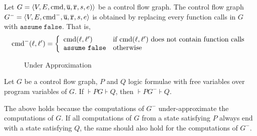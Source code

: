 
Let $G = \langle V, E, \textmd{cmd}, \overline{\texttt{u}}, \overline{\texttt{r}},s,e) \rangle$ be a control flow
graph. The control flow graph $G^- = \langle V, E,
\textmd{cmd}^-, \overline{\texttt{u}}, \overline{\texttt{r}},s,e \rangle$ is obtained by replacing every
function calls in $G$ with $\mathtt{assume\ false}$. That is,
\begin{equation*}
  \textmd{cmd}^- (\ell, \ell') =
  \left\{
    \begin{array}{ll}
      \textmd{cmd} (\ell, \ell') & 
      \textmd{if } \textmd{cmd} (\ell, \ell') 
      \textmd{ does not contain function calls}\\
      \mathtt{assume\ false} &
      \textmd{otherwise}
    \end{array}
  \right.
\end{equation*}

\begin{figure}
  \centering

  \caption{Under Approximation}
  \label{figure:under-approximation}
\end{figure}

\begin{proposition}
  Let $G$ be a control flow graph, $P$ and $Q$ logic formulae with
  free variables over program variables of $G$. If $\assert{P}
  G \assert{Q}$, then 
  $\assert{P} G^- \assert{Q}$.
\end{proposition}
The above holds because the computations of $G^-$ under-approximate the computations of $G$. If all computations of $G$ from a state satisfying $P$ always end with a state satisfying $Q$, the same should also hold for the computations of $G^-$.